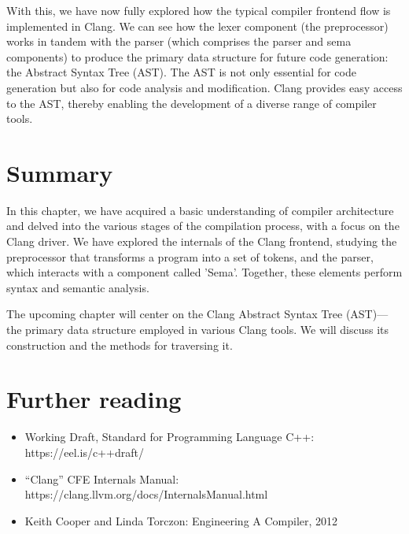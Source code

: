 With this, we have now fully explored how the typical compiler frontend flow is
implemented in Clang. We can see how the lexer component (the preprocessor)
works in tandem with the parser (which comprises the parser and sema components)
to produce the primary data structure for future code generation: the Abstract
Syntax Tree (AST). The AST is not only essential for code generation but also
for code analysis and modification. Clang provides easy access to the AST,
thereby enabling the development of a diverse range of compiler tools. 

\section{Summary}

In this chapter, we have acquired a basic understanding of compiler architecture
and delved into the various stages of the compilation process, with a focus on
the Clang driver. We have explored the internals of the Clang frontend, studying
the preprocessor that transforms a program into a set of tokens, and the parser,
which interacts with a component called 'Sema'. Together, these elements perform
syntax and semantic analysis. 

The upcoming chapter will center on the Clang Abstract Syntax Tree (AST)—the
primary data structure employed in various Clang tools. We will discuss its
construction and the methods for traversing it. 

\section{Further reading}
\begin{itemize}
\item Working Draft, Standard for Programming Language C++:
  https://eel.is/c++draft/ 
\item ``Clang'' CFE Internals Manual:
  https://clang.llvm.org/docs/InternalsManual.html
\item Keith Cooper and Linda Torczon: Engineering A Compiler, 2012
  \citep{book:engineering_a_compiler} 
\end{itemize}
